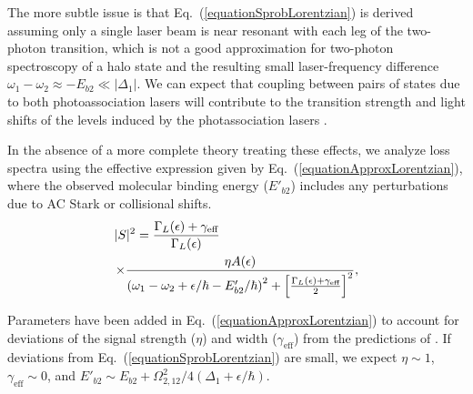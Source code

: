 The more subtle issue is that Eq.\ (\ref{equationSprobLorentzian}) is derived assuming only a single laser beam is near resonant with each leg of the two-photon transition, which is not a good approximation for two-photon spectroscopy of a halo state and the resulting small laser-frequency difference $\omega_1-\omega_2 \approx -E_{b2}\ll |\Delta_1|$. We can expect that coupling between pairs of states due to both photoassociation lasers will contribute to the transition strength and light shifts of the levels induced by the photassociation lasers \cite{bju96,bju99}.



In the absence of a more complete theory treating these effects, we analyze loss spectra using the effective expression given by Eq.\ (\ref{equationApproxLorentzian}), where the observed molecular binding energy ($E'_{b2}$) includes any perturbations due to AC Stark or collisional shifts.
\vbox{
\begin{eqnarray}\label{equationApproxLorentzian}
  \vert S\vert^2 = \frac{\Gamma_L(\epsilon)+\gamma_{\text{eff}}}{\Gamma_L(\epsilon)}\hspace{1.5in} \nonumber \\
  \times \frac{\eta  A(\epsilon)} {\left(\omega_1-\omega_2+\epsilon/\hbar-E'_{b2}/\hbar\right)^2+\left[
  	\frac{\Gamma_L(\epsilon)+\gamma_{\text{eff}}}{2}\right]^2},
\end{eqnarray}}



Parameters have been added in Eq.\ (\ref{equationApproxLorentzian}) to account for deviations of the signal strength ($\eta$) and width ($\gamma_{\text{eff}}$) from the predictions of   \cite{bju96}. If deviations from Eq.\ (\ref{equationSprobLorentzian}) are small, we expect $\eta\sim1$, $\gamma_{\text{eff}}\sim 0$, and $E'_{b2}\sim E_{b2}+{\Omega_{2,12}^{2}}/{4(\Delta_1+\epsilon/\hbar)}$.

